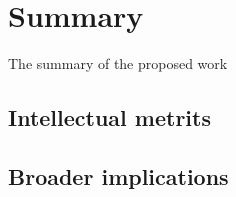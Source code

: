 
\section{Summary}

The summary of the proposed work

\subsection*{Intellectual metrits}

\subsection*{Broader implications}
